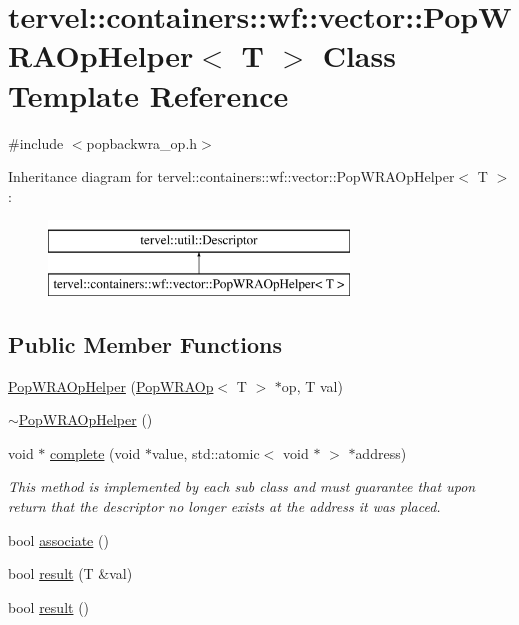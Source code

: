 \hypertarget{classtervel_1_1containers_1_1wf_1_1vector_1_1_pop_w_r_a_op_helper}{}\section{tervel\+:\+:containers\+:\+:wf\+:\+:vector\+:\+:Pop\+W\+R\+A\+Op\+Helper$<$ T $>$ Class Template Reference}
\label{classtervel_1_1containers_1_1wf_1_1vector_1_1_pop_w_r_a_op_helper}


{\ttfamily \#include $<$popbackwra\+\_\+op.\+h$>$}

Inheritance diagram for tervel\+:\+:containers\+:\+:wf\+:\+:vector\+:\+:Pop\+W\+R\+A\+Op\+Helper$<$ T $>$\+:\begin{figure}[H]
\begin{center}
\leavevmode
\includegraphics[height=2.000000cm]{classtervel_1_1containers_1_1wf_1_1vector_1_1_pop_w_r_a_op_helper}
\end{center}
\end{figure}
\subsection*{Public Member Functions}
\begin{DoxyCompactItemize}
\item 
\hyperlink{classtervel_1_1containers_1_1wf_1_1vector_1_1_pop_w_r_a_op_helper_a8347d7f3785c1bdbad3c865df59112fa}{Pop\+W\+R\+A\+Op\+Helper} (\hyperlink{classtervel_1_1containers_1_1wf_1_1vector_1_1_pop_w_r_a_op}{Pop\+W\+R\+A\+Op}$<$ T $>$ $\ast$op, T val)
\item 
\hyperlink{classtervel_1_1containers_1_1wf_1_1vector_1_1_pop_w_r_a_op_helper_aaece596129aece6c4a863a86eac19286}{$\sim$\+Pop\+W\+R\+A\+Op\+Helper} ()
\item 
void $\ast$ \hyperlink{classtervel_1_1containers_1_1wf_1_1vector_1_1_pop_w_r_a_op_helper_a4bb595dabd2cb32dc4171d82532c3413}{complete} (void $\ast$value, std\+::atomic$<$ void $\ast$ $>$ $\ast$address)
\begin{DoxyCompactList}\small\item\em This method is implemented by each sub class and must guarantee that upon return that the descriptor no longer exists at the address it was placed. \end{DoxyCompactList}\item 
bool \hyperlink{classtervel_1_1containers_1_1wf_1_1vector_1_1_pop_w_r_a_op_helper_a7290b783b392f57b6ef8195760a6abc0}{associate} ()
\item 
bool \hyperlink{classtervel_1_1containers_1_1wf_1_1vector_1_1_pop_w_r_a_op_helper_a1fcab473237a5d55a7389e6c8c871e2a}{result} (T \&val)
\item 
bool \hyperlink{classtervel_1_1containers_1_1wf_1_1vector_1_1_pop_w_r_a_op_helper_a3e8b506ad4e63de9f976f2057a0135d9}{result} ()
\end{DoxyCompactItemize}
